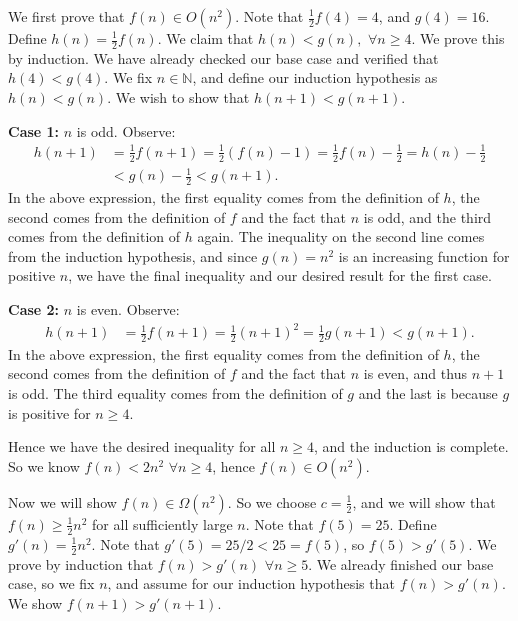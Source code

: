 \documentclass[10pt,oneside,reqno]{amsart}
\theoremstyle{plain}
\theoremstyle{definition}
\begin{document}
\begin{enumerate}[label=\arabic*.]
We first prove that $f(n) \in O(n^2)$. Note that $\frac{1}{2}f(4) =  4$, and $g(4) = 16$. Define $h(n) = \frac{1}{2}f(n)$.   We claim that $h(n) < g(n),$ $\forall n \geq 4$. We prove this by induction. We have already checked our base case and verified that $h(4) < g(4)$. We fix $n \in \mathbb{N}$, and define our induction hypothesis as $h(n) < g(n)$. We wish to show that $h(n + 1) < g(n + 1)$. 

\textbf{Case 1: }$n$ is odd. 
Observe: 
\begin{equation}
\begin{aligned}
h(n + 1) &= \frac{1}{2}f(n + 1) = \frac{1}{2}(f(n) - 1) = \frac{1}{2}f(n) - \frac{1}{2} = h(n) - \frac{1}{2}\\
&< g(n) - \frac{1}{2} < g(n + 1).
\end{aligned}
\end{equation}
In the above expression, the first equality comes from the definition of $h$, the second comes from the definition of $f$ and the fact that $n$ is odd, and the third comes from the definition of $h$ again. The inequality on the second line comes from the induction hypothesis, and since $g(n) = n^2$ is an increasing function for positive $n$, we have the final inequality and our desired result for the first case. 

\textbf{Case 2: }$n$ is even. Observe: 
\begin{equation}
\begin{aligned}
h(n + 1) &= \frac{1}{2}f(n + 1) = \frac{1}{2}(n  + 1)^2 =\frac{1}{2} g(n + 1) < g(n + 1). 
\end{aligned}
\end{equation}
In the above expression, the first equality comes from the definition of $h$, the second comes from the definition of $f$ and the fact that $n$ is even, and thus $n + 1$ is odd. The third equality comes from the definition of $g$ and the last is because $g$ is positive for $n \geq 4$. 

Hence we have the desired inequality for all $n \geq 4$, and the induction is complete. So we know $f(n) < 2n^2$ $\forall n\geq 4$, hence $f(n) \in O(n^2)$. 

Now we will show $f(n) \in \Omega(n^2)$. So we choose $c = \frac{1}{2}$, and we will show that $f(n) \geq \frac{1}{2}n^2$ for all sufficiently large $n$. Note that $f(5) = 25$. Define $g'(n) =  \frac{1}{2}n^2$. Note that $g'(5) = 25/2 < 25 = f(5)$, so $f(5) > g'(5)$. We prove by induction that $f(n) > g'(n)$ $\forall n \geq 5$. We already finished our base case, so we fix $n$, and assume for our induction hypothesis that $f(n) > g'(n)$. We show $f(n + 1) > g'(n + 1)$. 


\end{enumerate}
\end{document}
